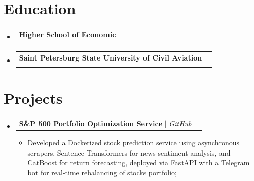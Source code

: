 \documentclass[letterpaper,11pt]{article}
\makeatletter
\newcommand{\resumeItem}[1]{
  \item\small{
    {#1 \vspace{-1pt}}
  }
}
\newcommand{\resumeSubheading}[4]{
  \vspace{-2pt}\item
    \begin{tabular*}{0.97\textwidth}[t]{l@{\extracolsep{\fill}}r}
      \textbf{#1} & \normalfont{#2} \\
      \normalfont{#3} & \textit{#4} \\
    \end{tabular*}\vspace{-5pt}
}
\newcommand{\resumeProjectHeading}[2]{
    \vspace{-2pt}\item
    \begin{tabular*}{0.97\textwidth}{l@{\extracolsep{\fill}}r}
      \small#1 & #2 \\
    \end{tabular*}\vspace{-7pt}
}
\newcommand{\resumeSubHeadingListStart}{\begin{itemize}[leftmargin=0.15in, label={}]}
\newcommand{\resumeSubHeadingListEnd}{\end{itemize}}
\newcommand{\resumeItemListStart}{\begin{itemize}}
\newcommand{\resumeItemListEnd}{\end{itemize}}
\makeatother
\begin{document}

\section{Education}
  \vspace{3pt}
  \resumeSubHeadingListStart
    \resumeSubheading
    {Higher School of Economic}{Sep 2023 -- Present}
    {Master's degree in Machine Learning and High Load Systems}{}
    \resumeSubheading
    {Saint Petersburg State University of Civil Aviation}{Sep 2016 -- Jun 2021}
    {Bachelor's degree in Maintenance of Aircraft and Engines}{}
  \resumeSubHeadingListEnd



\section{Projects}
    \vspace{3pt}
    \resumeSubHeadingListStart
      
      \resumeProjectHeading
        {\textbf{S\&P 500 Portfolio Optimization Service} $|$ \emph{\href{https://github.com/alexander-tereshin/Portfolio_Optimisation}{\color{blue}GitHub}}}{}
        \resumeItemListStart
            \resumeItem{Developed a Dockerized stock prediction service using asynchronous scrapers, Sentence-Transformers for news sentiment analysis, and CatBoost for return forecasting, deployed via FastAPI with a Telegram bot for real-time rebalancing of stocks portfolio;}
          \resumeItemListEnd
    \resumeSubHeadingListEnd
\end{document}
